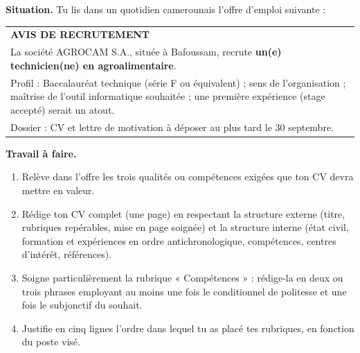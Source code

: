 \documentclass[11pt]{article}
\begin{document}
\begin{exercice}
\textbf{Situation.} Tu lis dans un quotidien camerounais l'offre d'emploi suivante :

\begin{center}
\begin{tabularx}{\linewidth}{|X|}
\hline
\textbf{AVIS DE RECRUTEMENT} \\
La société AGROCAM S.A., située à Bafoussam, recrute \textbf{un(e) technicien(ne) en agroalimentaire}. \\
Profil : Baccalauréat technique (série F ou équivalent) ; sens de l'organisation ; maîtrise de l'outil informatique souhaitée ; une première expérience (stage accepté) serait un atout. \\
Dossier : CV et lettre de motivation à déposer au plus tard le 30 septembre. \\
\hline
\end{tabularx}
\end{center}

\textbf{Travail à faire.}
\begin{enumerate}
\item Relève dans l'offre les trois qualités ou compétences exigées que ton CV devra mettre en valeur.
\item Rédige ton CV complet (une page) en respectant la structure externe (titre, rubriques repérables, mise en page soignée) et la structure interne (état civil, formation et expériences en ordre antichronologique, compétences, centres d'intérêt, références).
\item Soigne particulièrement la rubrique « Compétences » : rédige-la en deux ou trois phrases employant au moins une fois le conditionnel de politesse et une fois le subjonctif du souhait.
\item Justifie en cinq lignes l'ordre dans lequel tu as placé tes rubriques, en fonction du poste visé.
\end{enumerate}
\end{exercice}
\end{document}
